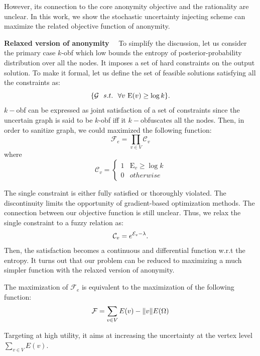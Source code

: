 However, its connection to the core anonymity objective and the rationality are unclear. 
In this work, we show the stochastic uncertainty injecting scheme can maximize the related objective function of anonymity.  

\textbf{Relaxed version of anonymity}~~
To simplify the discussion, let us consider the primary case $k$-obf which low bounds the entropy of posterior-probability distribution over all the nodes.  
It imposes a set of hard constraints on the output solution. 
To make it formal, let us define the set of feasible solutions satisfying all the constraints as:
\begin{equation*}
  \{\mathcal{G}~~s.t.~~ \forall v ~\mathrm{E}(v) \ge  \log k \}. 
\end{equation*}
$k-$obf can be expressed as joint satisfaction of a set of constraints 
since the uncertain graph is said to be $k$-obf iff it $k-$obfuscates all the nodes. 
Then, in order to sanitize graph, we could maximized the following function: 
\begin{equation*}
    \mathcal{F}_{e} = \prod_{v \in V} \mathcal{C}_{v}              
\end{equation*} 
where 
\begin{equation*}
  \mathcal{C}_{v} = 
  \begin{cases}
    1 & \mathrm{E}_{v} \ge  \log k \\ 
    0 & otherwise 
  \end{cases}
\end{equation*}

The single constraint {\Constraint} is either fully satisfied or thoroughly violated. 
The discontinuity limits the opportunity of gradient-based optimization methods.
The connection between our objective function is still unclear.  
Thus, we relax the single constraint {\Constraint} to a fuzzy relation as: 
\begin{equation*}
  \mathcal{C}_{v} = e^{\mathcal{E}_{v}-\lambda}.
  \vspace{-5pt}
\end{equation*}
Then, the satisfaction becomes a continuous and differential function w.r.t the entropy. 
It turns out that our problem can be reduced to maximizing a much simpler function with the relaxed version of anonymity.  

\begin{observation}
  The maximization of $\mathcal{F}_{e}$ is equivalent to the maximization of the following function:
  \begin{equation*}
    \mathcal{F} =  \sum_{v\in V} E(v) - \|v\| E(\Omega)
  \end{equation*}
\end{observation}
Targeting at high utility, it aims at increasing the uncertainty at the vertex level $\sum_{v \in V} E(v)$. 

